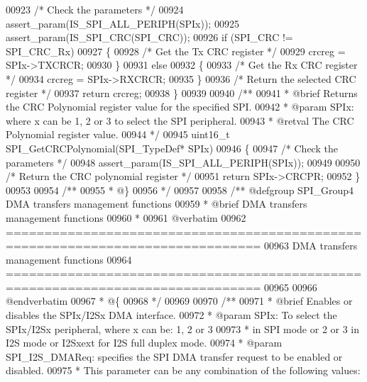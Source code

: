 \begin{DoxyCode}
00923   \textcolor{comment}{/* Check the parameters */}
00924   assert_param(IS\_SPI\_ALL\_PERIPH(SPIx));
00925   assert_param(IS\_SPI\_CRC(SPI\_CRC));
00926   \textcolor{keywordflow}{if} (SPI\_CRC != SPI_CRC_Rx)
00927   \{
00928     \textcolor{comment}{/* Get the Tx CRC register */}
00929     crcreg = SPIx->TXCRCR;
00930   \}
00931   \textcolor{keywordflow}{else}
00932   \{
00933     \textcolor{comment}{/* Get the Rx CRC register */}
00934     crcreg = SPIx->RXCRCR;
00935   \}
00936   \textcolor{comment}{/* Return the selected CRC register */}
00937   \textcolor{keywordflow}{return} crcreg;
00938 \}
00939 
00940 \textcolor{comment}{/**}
00941 \textcolor{comment}{  * @brief  Returns the CRC Polynomial register value for the specified SPI.}
00942 \textcolor{comment}{  * @param  SPIx: where x can be 1, 2 or 3 to select the SPI peripheral.}
00943 \textcolor{comment}{  * @retval The CRC Polynomial register value.}
00944 \textcolor{comment}{  */}
00945 uint16\_t SPI_GetCRCPolynomial(SPI\_TypeDef* SPIx)
00946 \{
00947   \textcolor{comment}{/* Check the parameters */}
00948   assert_param(IS\_SPI\_ALL\_PERIPH(SPIx));
00949 
00950   \textcolor{comment}{/* Return the CRC polynomial register */}
00951   \textcolor{keywordflow}{return} SPIx->CRCPR;
00952 \}
00953 
00954 \textcolor{comment}{/**}
00955 \textcolor{comment}{  * @\}}
00956 \textcolor{comment}{  */}
00957 
00958 \textcolor{comment}{/** @defgroup SPI\_Group4 DMA transfers management functions}
00959 \textcolor{comment}{ *  @brief   DMA transfers management functions}
00960 \textcolor{comment}{  *}
00961 \textcolor{comment}{@verbatim   }
00962 \textcolor{comment}{ ===============================================================================}
00963 \textcolor{comment}{                         DMA transfers management functions}
00964 \textcolor{comment}{ ===============================================================================  }
00965 \textcolor{comment}{}
00966 \textcolor{comment}{@endverbatim}
00967 \textcolor{comment}{  * @\{}
00968 \textcolor{comment}{  */}
00969 
00970 \textcolor{comment}{/**}
00971 \textcolor{comment}{  * @brief  Enables or disables the SPIx/I2Sx DMA interface.}
00972 \textcolor{comment}{  * @param  SPIx: To select the SPIx/I2Sx peripheral, where x can be: 1, 2 or 3 }
00973 \textcolor{comment}{  *         in SPI mode or 2 or 3 in I2S mode or I2Sxext for I2S full duplex mode. }
00974 \textcolor{comment}{  * @param  SPI\_I2S\_DMAReq: specifies the SPI DMA transfer request to be enabled or disabled. }
00975 \textcolor{comment}{  *          This parameter can be any combination of the following values:}

\end{DoxyCode}

